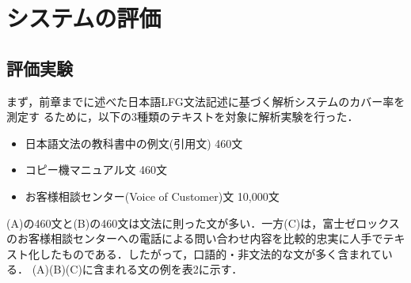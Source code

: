 \section{システムの評価}
\subsection{評価実験}
まず，前章までに述べた日本語LFG文法記述に基づく解析システムのカバー率を測定す
るために，以下の3種類のテキストを対象に解析実験を行った．
\begin{itemize}
\item[(A)]日本語文法の教科書\cite{kitagawa1988}中の例文(引用文) 460文
\item[(B)]コピー機マニュアル文\cite{manual} 460文
\item[(C)]お客様相談センター(Voice of Customer)文 10,000文
\end{itemize}

(A)の460文と(B)の460文は文法に則った文が多い．一方(C)は，富士ゼロックス
のお客様相談センターへの電話による問い合わせ内容を比較的忠実に人手でテキ
スト化したものである．したがって，口語的・非文法的な文が多く含まれている．
(A)(B)(C)に含まれる文の例を表2に示す．

